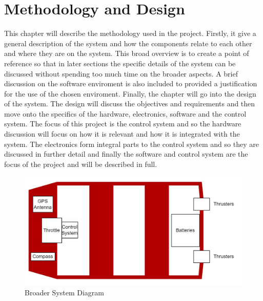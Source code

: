 \chapter{Methodology and Design}
This chapter will describe the methodology used in the project. Firstly, it give a general description of the system and how the components relate to each other and where they are on the system. This broad overview is to create a point of reference so that in later sections the specific details of the system can be discussed without spending too much time on the broader aspects. A brief discussion on the software enviroment is also included to provided a justification for the use of the chosen enviroment. Finally, the chapter will go into the design of the system. The design will discuss the objectives and requirements and then move onto the specifics of the hardware, electronics, software and the control system. The focus of this project is the control system and so the hardware discussion will focus on how it is relevant and how it is integrated with the system. The electronics form integral parts to the control system and so they are discussed in further detail and finally the software and control system are the focus of the project and will be described in full.\par
\begin{figure}[hb]
	\begin{center}
		\includegraphics[width = 0.7\linewidth]{figures/BoatLayout.jpg}
		\caption{Broader System Diagram}
		\label{fig:3:boatDiag}
	\end{center}
\end{figure}
